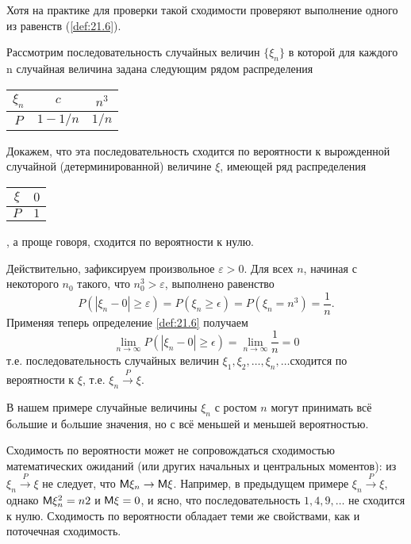 Хотя на практике для проверки такой сходимости проверяют выполнение
одного из равенств (\ref{def:21.6}).

\begin{repdefinition}[Пример]
Рассмотрим последовательность случайных величин $\{\xi_n\}$ в которой для каждого n случайная величина задана следующим рядом распределения
\begin{center}
	\begin{tabular}{|c|c|c|}
	\hline
	$\xi_n$ & $c$& $n^3$\\ \hline
	$P$ & $1-1/n$& $1/n$\\ \hline
	\end{tabular}	
\end{center}

	Докажем, что эта последовательность сходится по вероятности к вырожденной случайной (детерминированной) величине $\xi$, имеющей ряд распределения
	\begin{tabular}{|c|c|}
	\hline
	$\xi$ & $0$\\ \hline
	$P$ & $1$\\ \hline
	\end{tabular}, а проще говоря, сходится по вероятности к нулю.

	Действительно, зафиксируем произвольное $\varepsilon > 0$. Для всех $n$, начиная
с некоторого $n_0$ такого, что $n^3_0>\varepsilon$, выполнено равенство
\begin{equation*}
	P(|\xi_n-0|\geqslant\varepsilon)=P(\xi_n\geqslant\epsilon)=P(\xi_n=n^3)=\frac{1}{n}.
\end{equation*}
Применяя теперь определение \ref{def:21.6} получаем
\begin{equation*}
	\lim\limits_{n\to\infty} P(|\xi_n-0|\geqslant\epsilon)=\lim\limits_{n\to\infty}\frac{1}{n}=0
\end{equation*}
т.е. последовательность случайных величин $\xi_1, \xi_2, \dots , \xi_n, \dots $сходится по вероятности к $\xi$, т.е. $\xi_n \stackrel{P}{\to}\xi$.

В нашем примере случайные величины $\xi_n$ с ростом $n$ могут принимать
всё бoльшие и бoльшие значения, но с всё меньшей и меньшей вероятностью.
\end{repdefinition}


\begin{zam}
\label{zam:21.7}
Сходимость по вероятности может не сопровождаться сходимостью математических ожиданий (или других начальных и
центральных моментов): 
из $\xi_n\stackrel{P}{\to} \xi$ не следует, что $\mathsf{M}\xi_n \to \mathsf{M}\xi$. Например,
в предыдущем примере $\xi_n
\stackrel{P}{\to} \xi$, однако $\mathsf{M}\xi_n^2 = n2$ и $\mathsf{M}\xi = 0$, и ясно, что
последовательность $1, 4, 9, \dots$ не сходится к нулю.
Сходимость по вероятности обладает теми же свойствами, как и поточечная сходимость.
\end{zam}

